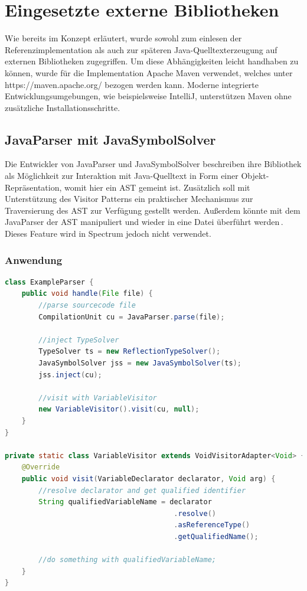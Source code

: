 \documentclass[12pt,oneside,a4paper,parskip]{scrbook}
\begin{document}
\section{Eingesetzte externe Bibliotheken}

Wie bereits im Konzept erläutert, wurde sowohl zum einlesen der Referenzimplementation als auch zur späteren Java-Quelltexterzeugung auf externen Bibliotheken zugegriffen. Um diese Abhängigkeiten leicht handhaben zu können, wurde für die Implementation Apache Maven verwendet, welches unter https://maven.apache.org/ bezogen werden kann. Moderne integrierte Entwicklungsumgebungen, wie beispielsweise IntelliJ, unterstützen Maven ohne zusätzliche Installationsschritte.

\subsection{JavaParser mit JavaSymbolSolver}

Die Entwickler von JavaParser und JavaSymbolSolver beschreiben ihre Bibliothek als Möglichkeit zur Interaktion mit Java-Quelltext in Form einer Objekt-Repräsentation, womit hier ein AST gemeint ist. Zusätzlich soll mit Unterstützung des Visitor Patterns ein praktischer Mechanismus zur Traversierung des AST zur Verfügung gestellt werden. Außerdem könnte mit dem JavaParser der AST manipuliert und wieder in eine Datei überführt werden\,\cite[S. 1]{javaparser2017}. Dieses Feature wird in Spectrum jedoch nicht verwendet.

\subsubsection{Anwendung}

\begin{lstlisting}[label=lst:jpVisit,
language=java,
firstnumber=1,
caption=Beispielhafte Initialisierung und Verwendung des JavaParsers und des JavaSymbolSolvers]
class ExampleParser {
	public void handle(File file) {
		//parse sourcecode file
		CompilationUnit cu = JavaParser.parse(file);
		
		//inject TypeSolver
		TypeSolver ts = new ReflectionTypeSolver();
		JavaSymbolSolver jss = new JavaSymbolSolver(ts);
		jss.inject(cu);
		
		//visit with VariableVisitor
		new VariableVisitor().visit(cu, null);
	}
}

private static class VariableVisitor extends VoidVisitorAdapter<Void> {
	@Override
	public void visit(VariableDeclarator declarator, Void arg) {
		//resolve declarator and get qualified identifier
		String qualifiedVariableName = declarator
										.resolve()
										.asReferenceType()
										.getQualifiedName();
		
		//do something with qualifiedVariableName;
	}
}
\end{lstlisting}
\end{document}
